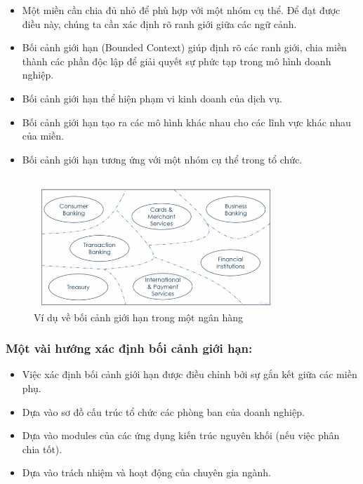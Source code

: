 \begin{itemize}

\item Một miền cần chia đủ nhỏ để phù hợp với một nhóm cụ thể. Để đạt được điều này, chúng ta cần xác định rõ ranh giới giữa các ngữ cảnh.

\item Bối cảnh giới hạn (Bounded Context) giúp định rõ các ranh giới, chia miền thành các phần độc lập để giải quyết sự phức tạp trong mô hình doanh nghiệp.

\item Bối cảnh giới hạn thể hiện phạm vi kinh doanh của dịch vụ.

\item Bối cảnh giới hạn tạo ra các mô hình khác nhau cho các lĩnh vực khác nhau của miền.

\item Bối cảnh giới hạn tương ứng với một nhóm cụ thể trong tổ chức.

\end{itemize}

\begin{figure}[H]

\centering

\includegraphics[width = 0.8\textwidth]{pictures/BoiCanhGioiHan/main.png}

\caption{Ví dụ về bối cảnh giới hạn trong một ngân hàng}

\end{figure}

\subsubsection{Một vài hướng xác định bối cảnh giới hạn:}

\begin{itemize}

\item Việc xác định bối cảnh giới hạn được điều chỉnh bởi sự gắn kết giữa các miền phụ.

\item Dựa vào sơ đồ cấu trúc tổ chức các phòng ban của doanh nghiệp.

\item Dựa vào modules của các ứng dụng kiến trúc nguyên khối (nếu việc phân chia tốt).

\item Dựa vào trách nhiệm và hoạt động của chuyên gia ngành.

\end{itemize}



